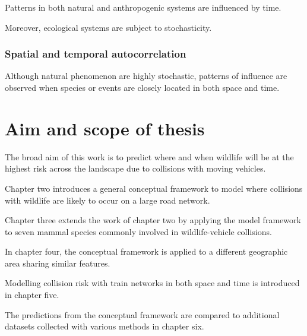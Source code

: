 Patterns in both natural and anthropogenic systems are influenced by time.

Moreover, ecological systems are subject to stochasticity.

\subsubsection{Spatial and temporal autocorrelation}

Although natural phenomenon are highly stochastic, patterns of influence are observed when species or events are closely located in both space and time.

\section{Aim and scope of thesis}

The broad aim of this work is to predict where and when wildlife will be at the highest risk across the landscape due to collisions with moving vehicles.

Chapter two introduces a general conceptual framework to model where collisions with wildlife are likely to occur on a large road network.

Chapter three extends the work of chapter two by applying the model framework to seven mammal species commonly involved in wildlife-vehicle collisions.

In chapter four, the conceptual framework is applied to a different geographic area sharing similar features.

Modelling collision risk with train networks in both space and time is introduced in chapter five.

The predictions from the conceptual framework are compared to additional datasets collected with various methods in chapter six.